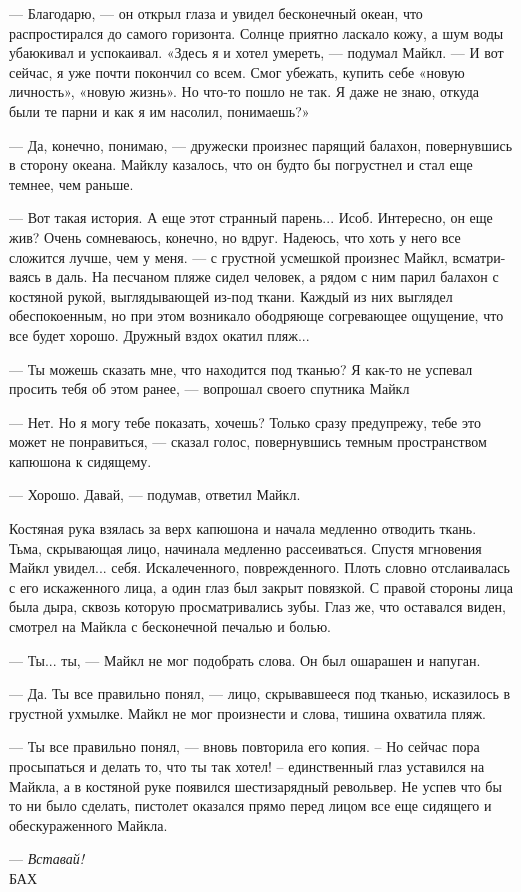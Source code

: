 — Благодарю, — он открыл глаза и увидел бесконечный океан, что распростирался до самого горизонта. Солнце приятно ласкало кожу, а шум воды убаюкивал и успокаивал. «Здесь я и хотел умереть, — подумал Майкл. — И вот сейчас, я уже почти покончил со всем. Смог убежать, купить себе «новую личность», «новую жизнь». Но что-то пошло не так. Я даже не знаю, откуда были те парни и как я им насолил, понимаешь?»

— Да, конечно, понимаю, — дружески произнес парящий балахон, повернувшись в сторону океана. Майклу казалось, что он будто бы погрустнел и стал еще темнее, чем раньше.

— Вот такая история. А еще этот странный парень... Исоб. Интересно, он еще жив? Очень сомневаюсь, конечно, но вдруг. Надеюсь, что хоть у него все сложится лучше, чем у меня. — с грустной усмешкой произнес Майкл, всматри-ваясь в даль. На песчаном пляже сидел человек, а рядом с ним парил балахон с костяной рукой, выглядывающей из-под ткани. Каждый из них выглядел обеспокоенным, но при этом возникало ободряюще согревающее ощущение, что все будет хорошо. Дружный вздох окатил пляж...

— Ты можешь сказать мне, что находится под тканью? Я как-то не успевал просить тебя об этом ранее, — вопрошал своего спутника Майкл 

— Нет. Но я могу тебе показать, хочешь? Только сразу предупрежу, тебе это может не понравиться, — сказал голос, повернувшись темным пространством капюшона к сидящему.

— Хорошо. Давай, — подумав, ответил Майкл.

Костяная рука взялась за верх капюшона и начала медленно отводить ткань. Тьма, скрывающая лицо, начинала медленно рассеиваться. Спустя мгновения Майкл увидел... себя. Искалеченного, поврежденного. Плоть словно отслаивалась с его искаженного лица, а один глаз был закрыт повязкой. С правой стороны лица была дыра, сквозь которую просматривались зубы. Глаз же, что оставался виден, смотрел на Майкла с бесконечной печалью и болью. 

— Ты... ты, — Майкл не мог подобрать слова. Он был ошарашен и напуган. 

— Да. Ты все правильно понял, — лицо, скрывавшееся под тканью, исказилось в грустной ухмылке.
Майкл не мог произнести и слова, тишина охватила пляж.

— Ты все правильно понял, — вновь повторила его копия. – Но сейчас пора просыпаться и делать то, что ты так хотел! – единственный глаз уставился на Майкла, а в костяной руке появился шестизарядный револьвер. Не успев что бы то ни было сделать, пистолет оказался прямо перед лицом все еще сидящего и обескураженного Майкла. 

— \textit{Вставай!}\\[0.5\baselineskip]

БАХ

\clearpage
{\begingroup
{}
\noindent
\endgroup}
\cleardoublepage
